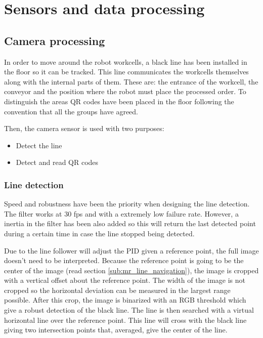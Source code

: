 \section{Sensors and data processing} %
\label{sec:mr_sensors_and_data_processing}

	\subsection{Camera processing} %
	\label{sub:mr_camera_processing}
	In order to move around the robot workcells, a black line has been installed in the floor so it can be tracked.
	This line communicates the workcells themselves along with the internal parts of them. 
	These are: the entrance of the workcell, the conveyor and the position where the robot must place the processed order.
	To distinguish the areas QR codes have been placed in the floor following the convention that all the groups have agreed.

	Then, the camera sensor is used with two purposes:
	\begin{itemize}
		\item Detect the line
		\item Detect and read QR codes
	\end{itemize}

	\subsubsection{Line detection} %
	\label{ssub:line_detection}
	Speed and robustness have been the priority when designing the line detection.
	The filter works at 30 fps and with a extremely low failure rate.
	However, a inertia in the filter has been also added so this will return the last detected point during a certain time in case the line stopped being detected.

	Due to the line follower will adjust the PID given a reference point, the full image doesn't need to be interpreted.
	Because the reference point is going to be the center of the image (read section \ref{sub:mr_line_navigation}), the image is cropped with a vertical offset about the reference point.
	The width of the image is not cropped so the horizontal deviation can be measured in the largest range possible.
	After this crop, the image is binarized with an RGB threshold which give a robust detection of the black line.
	The line is then searched with a virtual horizontal line over the reference point.
	This line will cross with the black line giving two intersection points that, averaged, give the center of the line.

